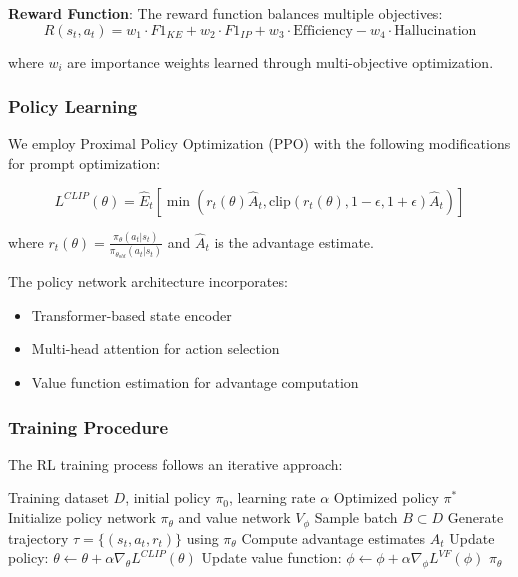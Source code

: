 \documentclass[11pt,a4paper]{article}
\begin{document}
\textbf{Reward Function}: The reward function balances multiple objectives:
\begin{equation}
R(s_t, a_t) = w_1 \cdot F1_{KE} + w_2 \cdot F1_{IP} + w_3 \cdot \text{Efficiency} - w_4 \cdot \text{Hallucination}
\end{equation}

where $w_i$ are importance weights learned through multi-objective optimization.

\subsubsection{Policy Learning}

We employ Proximal Policy Optimization (PPO) \citep{schulman2017proximal} with the following modifications for prompt optimization:

\begin{equation}
L^{CLIP}(\theta) = \hat{E}_t\left[\min\left(r_t(\theta)\hat{A}_t, \text{clip}(r_t(\theta), 1-\epsilon, 1+\epsilon)\hat{A}_t\right)\right]
\end{equation}

where $r_t(\theta) = \frac{\pi_\theta(a_t|s_t)}{\pi_{\theta_{old}}(a_t|s_t)}$ and $\hat{A}_t$ is the advantage estimate.

The policy network architecture incorporates:
\begin{itemize}
  \item Transformer-based state encoder
  \item Multi-head attention for action selection
  \item Value function estimation for advantage computation
\end{itemize}

\subsubsection{Training Procedure}

The RL training process follows an iterative approach:

\begin{algorithm}[H]
\caption{RL Prompt Optimization Training}
\begin{algorithmic}[1]
\REQUIRE Training dataset $D$, initial policy $\pi_0$, learning rate $\alpha$
\ENSURE Optimized policy $\pi^*$
\STATE Initialize policy network $\pi_\theta$ and value network $V_\phi$
    \STATE Sample batch $B \subset D$
        \STATE Generate trajectory $\tau = \{(s_t, a_t, r_t)\}$ using $\pi_\theta$
        \STATE Compute advantage estimates $\hat{A}_t$
        \STATE Update policy: $\theta \leftarrow \theta + \alpha \nabla_\theta L^{CLIP}(\theta)$
        \STATE Update value function: $\phi \leftarrow \phi + \alpha \nabla_\phi L^{VF}(\phi)$
    \ENDFOR
\ENDFOR
\RETURN $\pi_\theta$
\end{algorithmic}
\end{algorithm}
\end{document}
